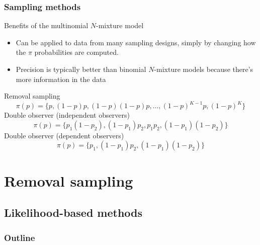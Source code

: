 \documentclass[color=usenames,dvipsnames]{beamer}\usepackage[]{graphicx}\usepackage[]{color}
\begin{document}
\begin{frame}
  \frametitle{Sampling methods}
  Benefits of the multinomial $N$-mixture model
  \begin{itemize}
    \item Can be applied to data from many sampling designs, simply by
      changing how the $\pi$ probabilities are computed. %
    \item Precision is typically better than binomial $N$-mixture
      models because there's more information in the data
  \end{itemize}
  \pause
  \vfill
  Removal sampling %
  \[
    {\pi(p)} = \{p, (1-p)p, (1-p)(1-p)p, \dots, (1-p)^{K-1}p, (1-p)^K\}
  \]
  \pause %
  Double observer (\alert{independent observers})
  \[
    {\pi(p)} = \{p_1(1-p_2), (1-p_1)p_2, p_1p_2, (1-p_1)(1-p_2)\}
  \]
  \pause %
  Double observer (\alert{dependent observers})
  \[
    {\pi(p)} = \{p_1, (1-p_1)p_2, (1-p_1)(1-p_2)\}
  \]
\end{frame}













\section{Removal sampling}

\subsection{Likelihood-based methods}

\begin{frame}
  \frametitle{Outline}
  \Large
  \tableofcontents[currentsection]
\end{frame}
\end{document}
